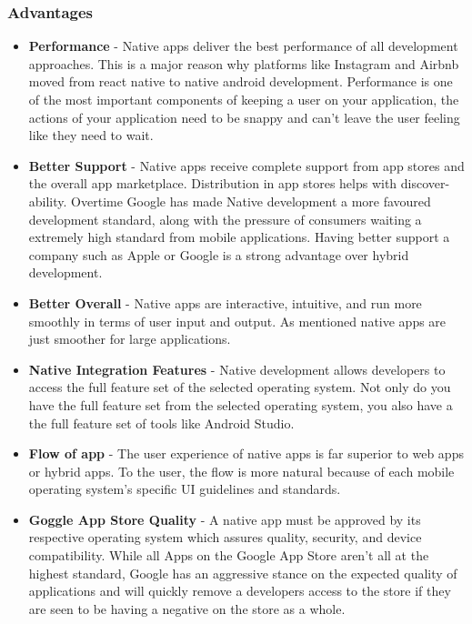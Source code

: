 \subsubsection{Advantages}
\begin{itemize}
    \item \textbf{Performance} - Native apps deliver the best performance of all development approaches. This is a major reason why platforms like Instagram and Airbnb \cite{react_native_ex10} \cite{react_native_ex20} moved from react native to native android development. Performance is one of the most important components of keeping a user on your application, the actions of your application need to be snappy and can't leave the user feeling like they need to wait.
    \item \textbf{Better Support} - Native apps receive complete support from app stores and the overall app marketplace. Distribution in app stores helps with discover-ability. Overtime Google has made Native development a more favoured development standard, along with the pressure of consumers waiting a extremely high standard from mobile applications. Having better support a company such as Apple or Google is a strong advantage over hybrid development.
    \item \textbf{Better Overall} - Native apps are interactive, intuitive, and run more smoothly in terms of user input and output. As mentioned native apps are just smoother for large applications.
    \item \textbf{Native Integration Features} - Native development allows developers to access the full feature set of the selected operating system. Not only do you have the full feature set from the selected operating system, you also have a the full feature set of tools like Android Studio.
    \item \textbf{Flow of app} - The user experience of native apps is far superior to web apps or hybrid apps. To the user, the flow is more natural because of each mobile operating system’s specific UI guidelines and standards.
    \item \textbf{Goggle App Store Quality} - A native app must be approved by its respective operating system which assures quality, security, and device compatibility. While all Apps on the Google App Store aren't all at the highest standard, Google has an aggressive stance on the expected quality of applications and will quickly remove a developers access to the store if they are seen to be having a negative on the store as a whole.
\end{itemize}
